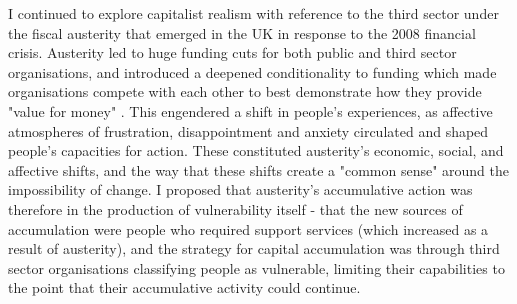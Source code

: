 I continued to explore capitalist realism with reference to the third sector under the fiscal austerity that emerged in the UK in response to the 2008 financial crisis. Austerity led to huge funding cuts for both public and third sector organisations, and introduced a deepened conditionality to funding  which made organisations compete with each other to best demonstrate how they provide "value for money" \citep{clifford_charitable_2017, jones_uneven_2016, clayton_distancing_2016}. This engendered a shift in people's experiences, as affective atmospheres of frustration, disappointment and anxiety circulated \citep{hitchen_living_2016} and shaped people's capacities for action. These constituted austerity's economic, social, and affective shifts, and the way that these shifts create a "common sense" around the impossibility of change. I proposed that austerity's accumulative action was therefore in the production of vulnerability itself - that the new sources of accumulation were people who required support services  (which increased as a result of austerity), and the strategy for capital accumulation was through third sector organisations classifying people as vulnerable, limiting their capabilities to the point that their accumulative activity could continue. 

